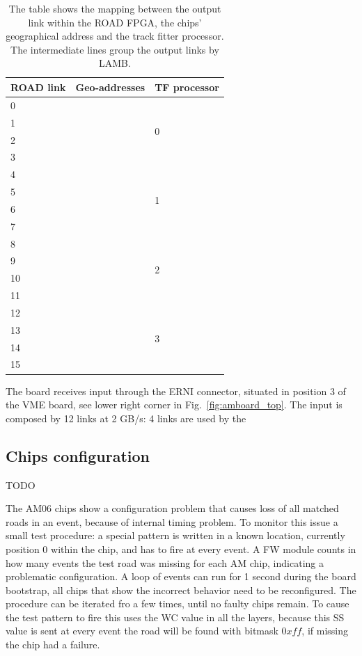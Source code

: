 \begin{table}
	\centering
	\begin{tabular}{|l|l|l|}
		\hline
		\textbf{ROAD link} & \textbf{Geo-addresses} & \textbf{TF processor} \\
		\hline\hline
		0 & & \multirow{4}{*}{0}\\
		1 & & \\
		2 & & \\
		3 & & \\
		\hline
		4 & & \multirow{4}{*}{1}\\
		5 & & \\
		6 & & \\
		7 & & \\
		\hline
		8 & & \multirow{4}{*}{2}\\
		9 & & \\
		10 & & \\
		11 & & \\
		\hline
		12 & & \multirow{4}{*}{3}\\
		13 & & \\
		14 & & \\
		15 & & \\
		\hline
	\end{tabular}
	
	\caption{The table shows the mapping between the output link within the
		ROAD FPGA, the chips' geographical address and the track fitter processor.
		The intermediate lines group the output links by LAMB.}
\end{table}
The board receives input through the ERNI connector, situated in position 3 of the
VME board, see lower right corner in Fig.~\ref{fig:amboard_top}. The input
is composed by 12 links at 2 GB/s: 4 links are used by the 

\subsection{Chips configuration}
\label{sec:chipconfig}
 TODO
 
The AM06 chips show a configuration problem that causes loss of all matched
roads in an event, because of internal timing problem. To monitor this issue a
small test procedure: a special pattern is written in a known location, currently
position 0 within the chip, and has to fire at every event. A FW module counts in
how many events the test road was missing for each AM chip, indicating a problematic
configuration.
A loop of events can run for 1 second during the board 
bootstrap, all chips that show the incorrect behavior need to be reconfigured.
The procedure can be iterated fro a few times, until no faulty chips remain.
To cause the test pattern to fire this uses the WC value in all the layers,
because this SS value is sent at every event the road will be found with bitmask
$0xff$, if missing the chip had a failure.
 
